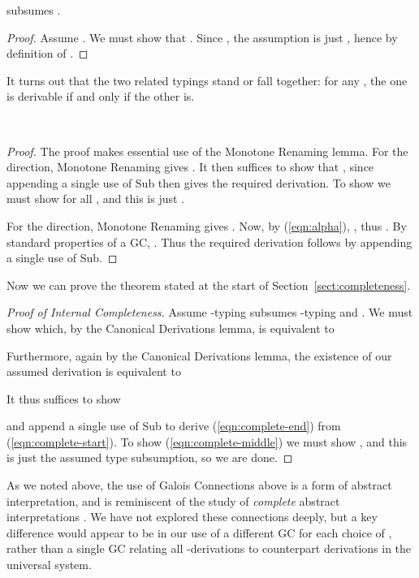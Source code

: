 \documentclass{sigplanconf}
\begin{document}
\begin{table}
\begin{lemma}
    subsumes 
    .
\end{lemma}
\begin{proof}
    Assume .
    We must show that .
    Since , the assumption
    is just ,
    hence  by definition of .
\end{proof}
It turns out that the two related typings stand or fall together: for any , the
one is derivable if and only if the other is.
\begin{lemma}\label{lemma:canonical}
\mbox{} \\

\end{lemma}
\begin{proof}
The proof makes essential use of the Monotone Renaming lemma.
For the  direction, Monotone Renaming gives
.
It then suffices to show that ,
since appending a single use of Sub then gives the required derivation.
To show  we must show
 for all , and this is
just .

For the  direction, Monotone Renaming gives
.
Now, by (\ref{eqn:alpha}),
,
thus
.
By standard properties of a GC, .
Thus the required derivation follows by appending a single use of Sub.
\end{proof}

Now we can prove the theorem stated at the start of Section~\ref{sect:completeness}.
\begin{proof}[Proof of Internal Completeness]
Assume 
-typing  subsumes
-typing  and
.
We must show  which,
by the Canonical Derivations lemma, is equivalent to

Furthermore, again by the Canonical Derivations lemma, the existence
of our assumed derivation is equivalent to

It thus suffices to show

and append a single use of Sub to derive (\ref{eqn:complete-end}) from (\ref{eqn:complete-start}).
To show (\ref{eqn:complete-middle}) we must show
,
and this is just the assumed type subsumption, so we are done.
\end{proof}
As we noted above, the use of Galois Connections above
is a form of abstract interpretation, and is reminiscent 
of the study of \emph{complete} abstract interpretations
\cite{CousotCousot79-1,GiacobazziRanzatoScozzari}.
We have not explored these connections deeply, but a key difference
would appear to be in our use of a different GC for each choice of
, rather than a single GC relating all
-derivations to counterpart
derivations in the universal system.


\end{table}
\end{document}
